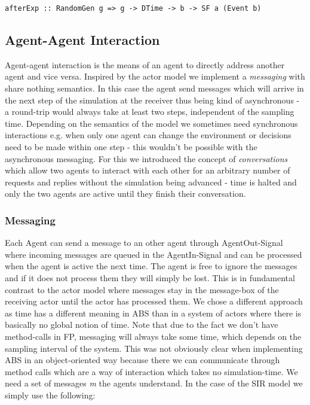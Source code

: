 \begin{verbatim}
afterExp :: RandomGen g => g -> DTime -> b -> SF a (Event b)
\end{verbatim}

\subsection{Agent-Agent Interaction}
Agent-agent interaction is the means of an agent to directly address another agent and vice versa. Inspired by the actor model we implement a  \textit{messaging} with share nothing semantics. In this case the agent send messages which will arrive in the next step of the simulation at the receiver thus being kind of asynchronous - a round-trip would always take at least two steps, independent of the sampling time. Depending on the semantics of the model we sometimes need synchronous interactions e.g. when only one agent can change the environment or decisions need to be made within one step - this wouldn't be possible with the asynchronous messaging. For this we introduced the concept of \textit{conversations} which allow two agents to interact with each other for an arbitrary number of requests and replies without the simulation being advanced - time is halted and only the two agents are active until they finish their conversation.

\subsubsection{Messaging}
Each Agent can send a message to an other agent through AgentOut-Signal where incoming messages are queued in the AgentIn-Signal and can be processed when the agent is active the next time. The agent is free to ignore the messages and if it does not process them they will simply be lost. This is in fundamental contrast to the actor model where messages stay in the message-box of the receiving actor until the actor has processed them. We chose a different approach as time has a different meaning in ABS than in a system of actors where there is basically no global notion of time.
Note that due to the fact we don't have method-calls in FP, messaging will always take some time, which depends on the sampling interval of the system. This was not obviously clear when implementing ABS in an object-oriented way because there we can communicate through method calls which are a way of interaction which takes no simulation-time.
We need a set of messages \textit{m} the agents understand. In the case of the SIR model we simply use the following:

